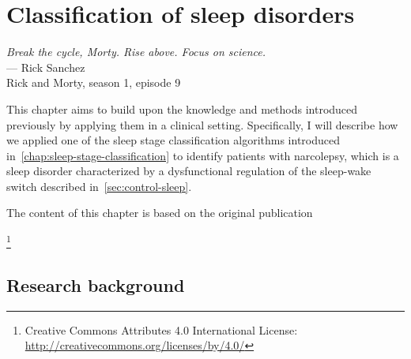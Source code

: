 \chapter{Classification of sleep disorders}\label{chap:classification-sleep-disorders}
\begin{flushright}{\slshape 
        Break the cycle, Morty. Rise above. Focus on science.} \\ \medskip
        --- Rick Sanchez\\Rick and Morty, season 1, episode 9
\end{flushright}
\vspace{6cm}

This chapter aims to build upon the knowledge and methods introduced previously by applying them in a clinical setting.
Specifically, I will describe how we applied one of the sleep stage classification algorithms introduced in~\cref{chap:sleep-stage-classification} to identify patients with narcolepsy, which is a sleep disorder characterized by a dysfunctional regulation of the sleep-wake switch described in~\cref{sec:control-sleep}.

The content of this chapter is based on the original publication  
\begin{displayquote}
    \footnote{Creative Commons Attributes 4.0 International License: \url{http://creativecommons.org/licenses/by/4.0/}}
\end{displayquote}

\section{Research background}

